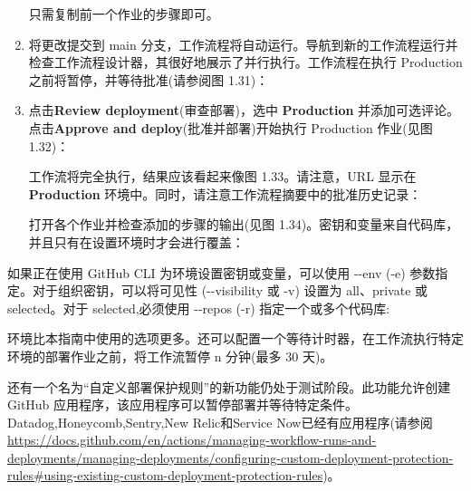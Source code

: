 \begin{enumerate}
只需复制前一个作业的步骤即可。

\item 
将更改提交到 main 分支，工作流程将自动运行。导航到新的工作流程运行并检查工作流程设计器，其很好地展示了并行执行。工作流程在执行 Production 之前将暂停，并等待批准(请参阅图 1.31)：


\item 
点击\textbf{Review deployment}(审查部署)，选中 \textbf{Production} 并添加可选评论。点击\textbf{Approve and deploy}(批准并部署)开始执行 Production 作业(见图 1.32)：


工作流将完全执行，结果应该看起来像图 1.33。请注意，URL 显示在 \textbf{Production} 环境中。同时，请注意工作流程摘要中的批准历史记录：


打开各个作业并检查添加的步骤的输出(见图 1.34)。密钥和变量来自代码库，并且只有在设置环境时才会进行覆盖：


\end{enumerate}


如果正在使用 GitHub CLI 为环境设置密钥或变量，可以使用 -{}-env (-e) 参数指定。对于组织密钥，可以将可见性 (-{}-visibility 或 -v) 设置为 all、private 或 selected。对于 selected,必须使用 -{}-repos (-r) 指定一个或多个代码库:


环境比本指南中使用的选项更多。还可以配置一个等待计时器，在工作流执行特定环境的部署作业之前，将工作流暂停 n 分钟(最多 30 天)。

还有一个名为“自定义部署保护规则”的新功能仍处于测试阶段。此功能允许创建 GitHub 应用程序，该应用程序可以暂停部署并等待特定条件。 Datadog,Honeycomb,Sentry,New Relic和Service Now已经有应用程序(请参阅\url{https://docs.github.com/en/actions/managing-workflow-runs-and-deployments/managing-deployments/configuring-custom-deployment-protection-rules#using-existing-custom-deployment-protection-rules})。

